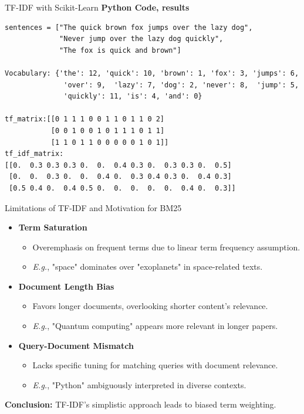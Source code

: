 \documentclass{beamer}
\newenvironment{stepitemize}{\begin{itemize}[<+->]}{\end{itemize} }
\begin{document}
\begin{frame}[fragile]{TF-IDF with Scikit-Learn}
\small
\textbf{Python Code, results}
\begin{tcolorbox}[colback=lightgray, colframe=lightgray,
                  boxsep=0mm, arc=1mm, boxrule=0mm,
                  left=1mm, right=1mm, top=1mm, bottom=1mm]
\begin{Verbatim}[fontsize=\scriptsize, bgcolor=lightgray]
sentences = ["The quick brown fox jumps over the lazy dog",
             "Never jump over the lazy dog quickly",
             "The fox is quick and brown"]

Vocabulary: {'the': 12, 'quick': 10, 'brown': 1, 'fox': 3, 'jumps': 6,
              'over': 9,  'lazy': 7, 'dog': 2, 'never': 8,  'jump': 5,
              'quickly': 11, 'is': 4, 'and': 0}

tf_matrix:[[0 1 1 1 0 0 1 1 0 1 1 0 2]
           [0 0 1 0 0 1 0 1 1 1 0 1 1]
           [1 1 0 1 1 0 0 0 0 0 1 0 1]]
tf_idf_matrix:
[[0.  0.3 0.3 0.3 0.  0.  0.4 0.3 0.  0.3 0.3 0.  0.5]
 [0.  0.  0.3 0.  0.  0.4 0.  0.3 0.4 0.3 0.  0.4 0.3]
 [0.5 0.4 0.  0.4 0.5 0.  0.  0.  0.  0.  0.4 0.  0.3]]
\end{Verbatim}
\end{tcolorbox}
\end{frame}

\begin{frame}{Limitations of TF-IDF and Motivation for BM25}
\small
\begin{stepitemize}
\item \textbf{Term Saturation}
\begin{itemize}
  \item Overemphasis on frequent terms due to linear term frequency assumption.
  \item \textit{E.g.}, "space" dominates over "exoplanets" in space-related texts.
\end{itemize}

\item \textbf{Document Length Bias}
\begin{itemize}
  \item Favors longer documents, overlooking shorter content's relevance.
  \item \textit{E.g.}, "Quantum computing" appears more relevant in longer papers.
\end{itemize}

\item \textbf{Query-Document Mismatch}
\begin{itemize}
  \item Lacks specific tuning for matching queries with document relevance.
  \item \textit{E.g.}, "Python" ambiguously interpreted in diverse contexts.
\end{itemize}
\end{stepitemize}
\pause
\textbf{Conclusion:} TF-IDF's simplistic approach leads to biased term weighting.

\end{frame}
\end{document}

